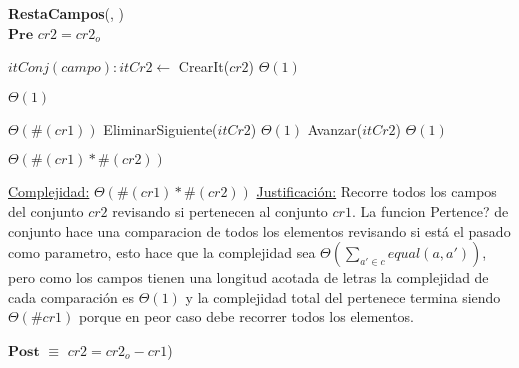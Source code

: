\begin{algorithm}[H]{{\textbf{RestaCampos}(, )}}
	{\\ $\textbf{Pre}$ $cr2 = cr2_o$}
    	\begin{algorithmic}[1]

    		\State $itConj(campo): itCr2 \gets$ CrearIt($cr2$) \Comment $\Theta(1)$

    		 \Comment $\Theta(1)$

    			 \Comment $\Theta(\#(cr1))$
    				\State EliminarSiguiente($itCr2$) \Comment $\Theta(1)$
    			\Else
    				\State Avanzar($itCr2$) \Comment $\Theta(1)$
    			\EndIf

    		\EndWhile \Comment $\Theta(\#(cr1) * \#(cr2))$
		
			\medskip
			\Statex \underline{Complejidad:} $\Theta(\#(cr1) * \#(cr2))$
			\Statex \underline{Justificación:} Recorre todos los campos del conjunto $cr2$ revisando si pertenecen al conjunto $cr1$. La funcion Pertence? de conjunto hace una comparacion de todos los elementos revisando si está el pasado como parametro, esto hace que la complejidad sea $\Theta\left(\displaystyle\sum_{a' \in c}equal(a,a')\right)$, pero como los campos tienen una longitud acotada de letras la complejidad de cada comparación es $\Theta(1)$ y la complejidad total del pertenece termina siendo $\Theta(\#cr1)$ porque en peor caso debe recorrer todos los elementos.
    	\end{algorithmic}
	{$\textbf{Post}$ $\equiv$ $cr2 = cr2_o - cr1$)}
\end{algorithm}